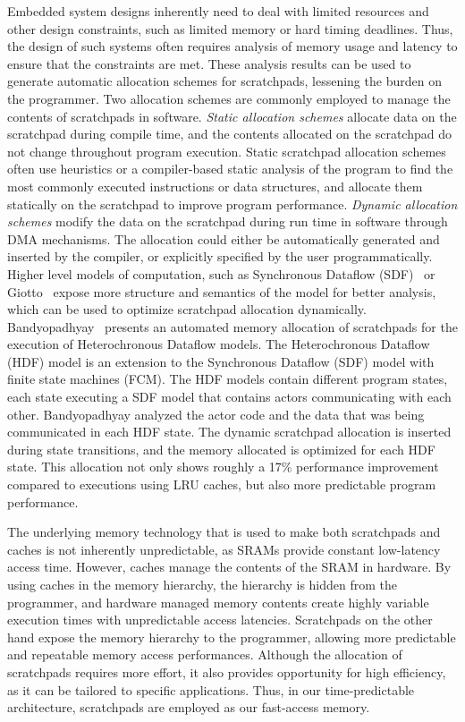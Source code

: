Embedded system designs inherently need to deal with limited resources and other design constraints, such as limited memory or hard timing deadlines.    
Thus, the design of such systems often requires analysis of memory usage and latency to ensure that the constraints are met.
These analysis results can be used to generate automatic allocation schemes for scratchpads, lessening the burden on the programmer.
Two allocation schemes are commonly employed to manage the contents of scratchpads in software.
\emph{Static allocation schemes} allocate data on the scratchpad during compile time, and the contents allocated on the scratchpad do not change throughout program execution. 
Static scratchpad allocation schemes~\cite{Suhendra2005WCETSPM, Patel2008PRETSPM} often use heuristics or a compiler-based static analysis of the program to find the most commonly executed instructions or data structures, and allocate them statically on the scratchpad to improve program performance. 
\emph{Dynamic allocation schemes} modify the data on the scratchpad during run time in software through DMA mechanisms.
The allocation could either be automatically generated and inserted by the compiler, or explicitly specified by the user programmatically.
Higher level models of computation, such as Synchronous Dataflow (SDF)~\cite{lee_sdf} or Giotto~\cite{henzinger_giotto} expose more structure and semantics of the model for better analysis, which can be used to optimize scratchpad allocation dynamically.
Bandyopadhyay~\cite{Bandyopadhyay06_AutomatedMemoryAllocationOfActorCodeDataBufferInHeterochronous} presents an automated memory allocation of scratchpads for the execution of Heterochronous Dataflow models.
The Heterochronous Dataflow (HDF) model is an extension to the Synchronous Dataflow (SDF) model with finite state machines (FCM). 
The HDF models contain different program states, each state executing a SDF model that contains actors communicating with each other. 
Bandyopadhyay analyzed the actor code and the data that was being communicated in each HDF state.
The dynamic scratchpad allocation is inserted during state transitions, and the memory allocated is optimized for each HDF state. 
This allocation not only shows roughly a 17\% performance improvement compared to executions using LRU caches, but also more predictable program performance.

The underlying memory technology that is used to make both scratchpads and caches is not inherently unpredictable, as SRAMs provide constant low-latency access time. 
However, caches manage the contents of the SRAM in hardware. 
By using caches in the memory hierarchy, the hierarchy is hidden from the programmer, and hardware managed memory contents create highly variable execution times with unpredictable access latencies. 
Scratchpads on the other hand expose the memory hierarchy to the programmer, allowing more predictable and repeatable memory access performances.
Although the allocation of scratchpads requires more effort, it also provides opportunity for high efficiency, as it can be tailored to specific applications.   
Thus, in our time-predictable architecture, scratchpads are employed as our fast-access memory. 

